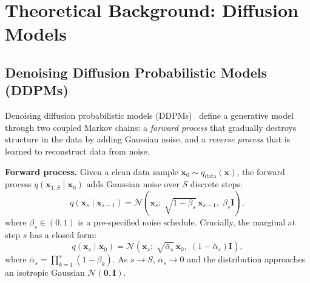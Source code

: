\documentclass[11pt,a4paper]{article}
\newcommand{\bx}{\mathbf{x}}
\begin{document}
\section{Theoretical Background: Diffusion Models}
\label{sec:diffusion}

\subsection{Denoising Diffusion Probabilistic Models (DDPMs)}

Denoising diffusion probabilistic models (DDPMs)~\cite{ho2020} define a generative model through
two coupled Markov chains: a \emph{forward process} that gradually destroys structure in the data
by adding Gaussian noise, and a \emph{reverse process} that is learned to reconstruct data from
noise.

\textbf{Forward process.}  Given a clean data sample $\bx_0 \sim q_{\text{data}}(\bx)$, the
forward process $q(\bx_{1:S} \mid \bx_0)$ adds Gaussian noise over $S$ discrete steps:
\begin{equation}
  q(\bx_s \mid \bx_{s-1}) = \mathcal{N}\!\left(\bx_s;\; \sqrt{1-\beta_s}\,\bx_{s-1},\;
  \beta_s \bm{I}\right),
  \label{eq:forward_step}
\end{equation}
where $\beta_s \in (0, 1)$ is a pre-specified noise schedule.  Crucially, the marginal at step $s$
has a closed form:
\begin{equation}
  q(\bx_s \mid \bx_0) = \mathcal{N}\!\left(\bx_s;\; \sqrt{\bar\alpha_s}\,\bx_0,\;
  (1-\bar\alpha_s)\bm{I}\right),
  \label{eq:forward_marginal}
\end{equation}
where $\bar\alpha_s = \prod_{k=1}^{s} (1-\beta_k)$.  As $s \to S$, $\bar\alpha_s \to 0$ and the
distribution approaches an isotropic Gaussian $\mathcal{N}(\bm{0}, \bm{I})$.
\end{document}
